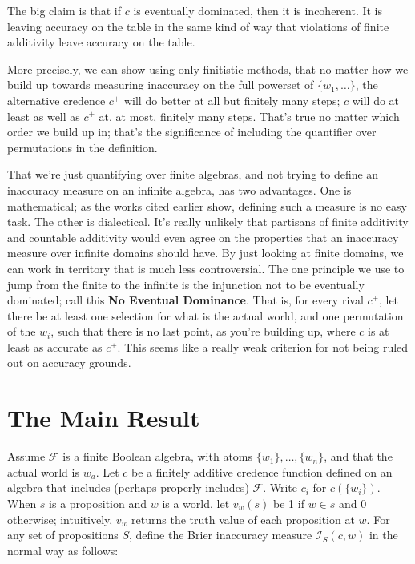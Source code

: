 \documentclass[
  11pt,
  letterpaper,
  DIV=11,
  numbers=noendperiod,
  twoside]{scrartcl}
\theoremstyle{definition}
\theoremstyle{plain}
\theoremstyle{plain}
\theoremstyle{remark}
\begin{document}
The big claim is that if \(c\) is eventually dominated, then it is
incoherent. It is leaving accuracy on the table in the same kind of way
that violations of finite additivity leave accuracy on the table.

More precisely, we can show using only finitistic methods, that no
matter how we build up towards measuring inaccuracy on the full powerset
of \(\{w_1, \dots\}\), the alternative credence \(c^+\) will do better
at all but finitely many steps; \(c\) will do at least as well as
\(c^+\) at, at most, finitely many steps. That's true no matter which
order we build up in; that's the significance of including the
quantifier over permutations in the definition.

That we're just quantifying over finite algebras, and not trying to
define an inaccuracy measure on an infinite algebra, has two advantages.
One is mathematical; as the works cited earlier show, defining such a
measure is no easy task. The other is dialectical. It's really unlikely
that partisans of finite additivity and countable additivity would even
agree on the properties that an inaccuracy measure over infinite domains
should have. By just looking at finite domains, we can work in territory
that is much less controversial. The one principle we use to jump from
the finite to the infinite is the injunction not to be eventually
dominated; call this \textbf{No Eventual Dominance}. That is, for every
rival \(c^+\), let there be at least one selection for what is the
actual world, and one permutation of the \(w_i\), such that there is no
last point, as you're building up, where \(c\) is at least as accurate
as \(c^+\). This seems like a really weak criterion for not being ruled
out on accuracy grounds.

\section{The Main Result}\label{the-main-result}

Assume \(\mathcal{F}\) is a finite Boolean algebra, with atoms
\(\{w_1\}, \dots, \{w_n\}\), and that the actual world is \(w_a\). Let
\(c\) be a finitely additive credence function defined on an algebra
that includes (perhaps properly includes) \(\mathcal{F}\). Write \(c_i\)
for \(c(\{w_i\})\). When \(s\) is a proposition and \(w\) is a world,
let \(v_w(s)\) be 1 if \(w \in s\) and 0 otherwise; intuitively, \(v_w\)
returns the truth value of each proposition at \(w\). For any set of
propositions \(S\), define the Brier inaccuracy measure
\(\mathcal{I}_S(c, w)\) in the normal way as follows:
\end{document}
